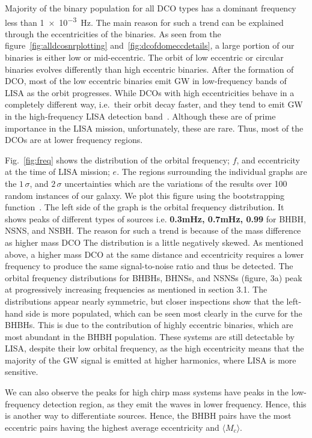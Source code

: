 \documentclass[journal, twocolumn]{IEEEtran}
\begin{document}
    Majority of the binary population for all DCO types has a dominant frequency less than \SI{1e-3}{\hertz}.
    The main reason for such a trend can be explained through the eccentricities of the binaries.
    As seen from the figure~\ref{fig:alldcosnrplotting} and~\ref{fig:dcofdomeccdetails}, a large portion of our binaries is either low or mid-eccentric.
    The orbit of low eccentric or circular binaries evolves differently than high eccentric binaries.
    After the formation of DCO, most of the low eccentric binaries emit GW in low-frequency bands of LISA as the orbit progresses.
    While DCOs with high eccentricities behave in a completely different way, i.e.\ their orbit decay faster, and they tend to emit GW in the high-frequency LISA detection band~\cite{Peters1963, Peters1964}.
    Although these are of prime importance in the LISA mission, unfortunately, these are rare.
    Thus, most of the DCOs are at lower frequency regions.
    
    Fig.~\ref{fig:freq} shows the distribution of the orbital frequency; $f$, and eccentricity at the time of LISA mission; $e$.
    The regions surrounding the individual graphs are the $1\,\sigma$, and $2\,\sigma$ uncertainties which are the variations of the results over 100 random instances of our galaxy.
    We plot this figure using the bootstrapping function~\cite{wagg2021gravitational}.
    The left side of the graph is the orbital frequency distribution.
    It shows peaks of different types of sources i.e. \textbf{0.3mHz, 0.7mHz, 0.99} for BHBH, NSNS, and NSBH\@.
    The reason for such a trend is because of the mass difference as higher mass DCO The distribution is a little negatively skewed.
    As mentioned above, a higher mass DCO at the same distance and eccentricity requires a lower frequency to produce the same signal-to-noise ratio and thus be detected.
    The orbital frequency distributions for BHBHs, BHNSs, and NSNSs (figure, 3a) peak at progressively increasing
    frequencies as mentioned in section 3.1.
    The distributions appear nearly symmetric, but closer inspections show that the left-hand side is more populated, which can be seen most clearly in the curve for the BHBHs.
    This is due to the contribution of highly eccentric binaries, which are most abundant in the BHBH population.
    These systems are still detectable by LISA, despite their low orbital frequency, as the high eccentricity means that the majority of the GW signal is emitted at higher harmonics, where LISA is more sensitive.
    
    We can also observe the peaks for high chirp mass systems have peaks in the low-frequency detection region, as they emit the waves in lower frequency.
    Hence, this is another way to differentiate sources.
    Hence, the BHBH pairs have the most eccentric pairs having the highest average eccentricity and $\langle M_c\rangle$.
    
\end{document}
